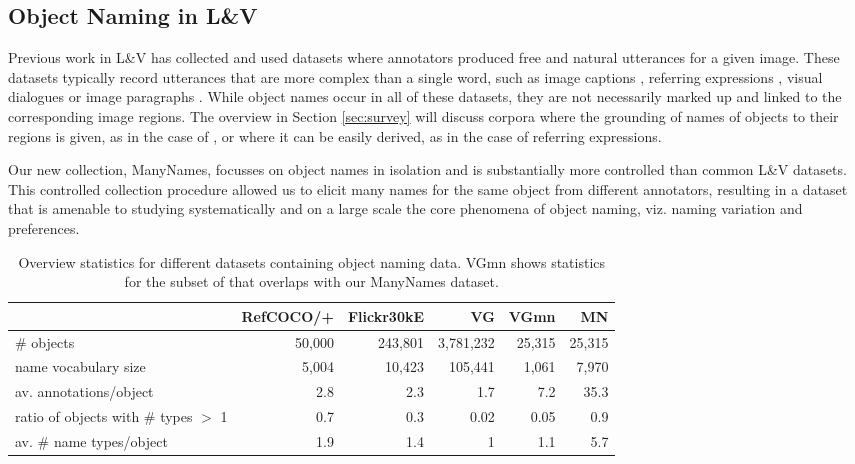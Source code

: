 \subsection{Object Naming in L\&V} 
Previous work in L\&V has collected and used datasets where annotators produced free and natural utterances for a given image. 
These datasets typically record utterances that are more complex than a single word, such as image captions \cite{fangetal:2015,devlin:imcaqui,Bernardietal:automatic}, referring expressions \cite{Kazemzadeh2014,mao15,Yu2016}, visual dialogues \cite{das2017visual,vries2017guesswhat} or image paragraphs \cite{krause2017hierarchical}. 
While object names occur in all of these datasets, they are not necessarily marked up and linked to the corresponding image regions. The overview in Section \ref{sec:survey} will discuss corpora where the grounding of names of objects to their regions is given, as in the case of \vgenome \cite{krishna2016visualgenome}, or where it can be easily derived, as in the case of referring expressions.

Our new collection, ManyNames, focusses on object names in isolation and is substantially more controlled than common L\&V datasets. This controlled collection procedure allowed us to elicit many names for the same object from different annotators, resulting in a dataset that is amenable to  studying systematically and on a large scale the core phenomena of object naming, viz. naming variation and preferences. 

\begin{table*}[htb]
  \centering
  \begin{tabular}{lrrrrr}
    \toprule
    &   RefCOCO/+  &  Flickr30kE &           VG &      VGmn &        MN \\
    \midrule
    \# objects & 50,000 & 243,801 & 3,781,232 & 25,315 & 25,315 \\
    name vocabulary size &  5,004 &  10,423 &   105,441 &  1,061 &  7,970 \\
    av. annotations/object &      2.8 &       2.3 &         1.7 &      7.2 &     35.3 \\
    ratio of objects with \# types $>$ 1 &      0.7 &       0.3 &         0.02 &      0.05 &      0.9 \\
    av. \# name types/object &      1.9 &       1.4 &         1 &      1.1 &      5.7 \\
    \bottomrule
  \end{tabular}
  \caption{Overview statistics for different datasets containing object naming data. VGmn shows statistics for the subset of \vg that overlaps with our ManyNames dataset.\label{tab:compare}}
\end{table*}


